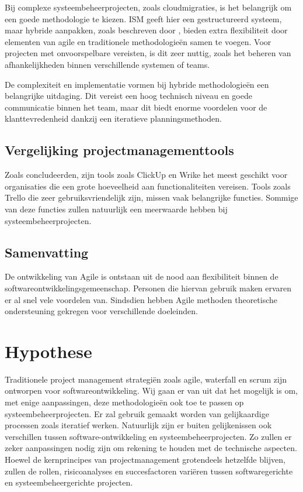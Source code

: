 \documentclass{article}
\begin{document}
    Bij complexe systeembeheerprojecten, zoals cloudmigraties, is het belangrijk om een goede methodologie te kiezen. 
    ISM geeft hier een gestructureerd systeem, maar hybride aanpakken, zoals beschreven door \textcite{reiff2022hybrid}, 
    bieden extra flexibiliteit door elementen van agile en traditionele methodologieën samen te voegen.
    Voor projecten met onvoorspelbare vereisten, is dit zeer nuttig, zoals het beheren van afhankelijkheden binnen verschillende systemen of teams. \autocite{reiff2022hybrid}

    De complexiteit en implementatie vormen bij hybride methodologieën een belangrijke uitdaging.
    Dit vereist een hoog technisch niveau en goede communicatie binnen het team, maar dit biedt enorme voordelen voor de klanttevredenheid dankzij een iteratieve planningsmethoden. \autocite{reiff2022hybrid}

    \subsection{Vergelijking projectmanagementtools}

    Zoals \textcite{pasaric2022comparison} concludeerden, zijn tools zoals ClickUp en Wrike het meest geschikt voor organisaties die een grote hoeveelheid aan functionaliteiten vereisen. 
    Tools zoals Trello die zeer gebruiksvriendelijk zijn, missen vaak belangrijke functies. 
    Sommige van deze functies zullen natuurlijk een meerwaarde hebben bij systeembeheerprojecten. \autocite{pasaric2022comparison}

    \subsection{Samenvatting}
    De ontwikkeling van Agile is ontstaan uit de nood aan flexibiliteit binnen de softwareontwikkelingsgemeenschap. 
    Personen die hiervan gebruik maken ervaren er al snel vele voordelen van.
    Sindsdien hebben Agile methoden theoretische ondersteuning gekregen voor verschillende doeleinden. \autocite{STRAY2022107058}

    \section{Hypothese}

    Traditionele project management strategiën zoals agile, waterfall en scrum zijn ontworpen voor softwareontwikkeling. 
    Wij gaan er van uit dat het mogelijk is om, met enige aanpassingen, deze methodologieën ook toe te passen op systeembeheerprojecten.
    Er zal gebruik gemaakt worden van gelijkaardige processen zoals iteratief werken.\newline
    Natuurlijk zijn er buiten gelijkenissen ook verschillen tussen software-ontwikkeling en systeembeheerprojecten. 
    Zo zullen er zeker aanpassingen nodig zijn om rekening te houden met de technische aspecten.
    Hoewel de kernprincipes van projectmanagement grotendeels hetzelfde blijven, zullen de rollen, risicoanalyses en 
    succesfactoren variëren tussen softwaregerichte en systeembeheergerichte projecten.
\end{document}
